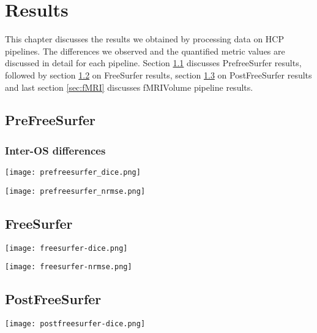 \chapter{Results}
This chapter discusses the results we obtained by processing data on HCP pipelines. The differences we observed and the quantified metric values are discussed in detail for each pipeline. Section \ref{sec:Prefreesurfer} discusses PrefreeSurfer results, followed by section \ref{sec:Freesurfer} on FreeSurfer results, section \ref{sec:Postfreesurfer} on PostFreeSurfer results and last section \ref{sec:fMRI} discusses fMRIVolume pipeline results.

\section{PreFreeSurfer} \label{sec:Prefreesurfer}

\subsection{Inter-OS differences}
\begin{center}
  \texttt{[image: prefreesurfer\_dice.png]}
   \label{fig:Prefreesurfer_Dice}
\end{center}

\begin{center}
  \texttt{[image: prefreesurfer\_nrmse.png]}
   \label{fig:Prefreesurfer_NRMSE}
\end{center}

\section{FreeSurfer} \label{sec:Freesurfer}
\begin{center}
  \texttt{[image: freesurfer-dice.png]}
   \label{fig:Freesurfer_Dice}
\end{center}

\begin{center}
  \texttt{[image: freesurfer-nrmse.png]}
   \label{fig:Freesurfer_NRMSE}
\end{center}

\section{PostFreeSurfer}\label{sec:Postfreesurfer}
\begin{center}
  \texttt{[image: postfreesurfer-dice.png]}
   \label{fig:Postfreesurfer_Dice}
\end{center}

